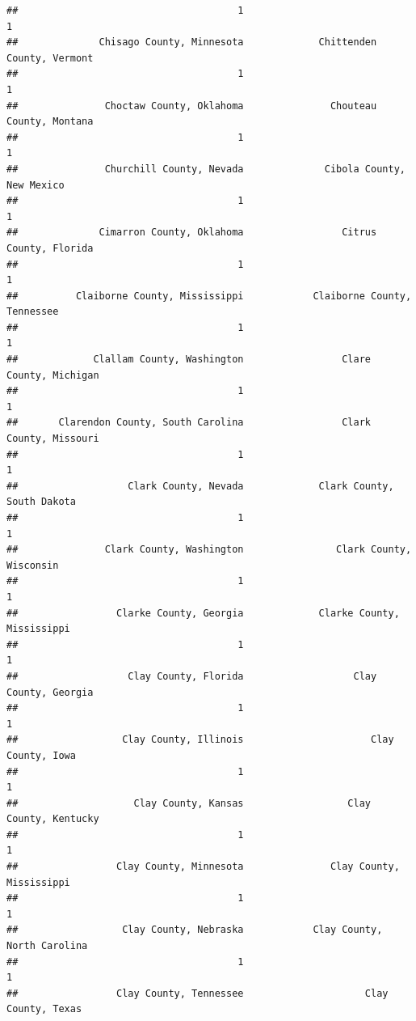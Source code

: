 \documentclass[
]{article}
\begin{document}
\begin{verbatim}
##                                      1                                      1 
##              Chisago County, Minnesota             Chittenden County, Vermont 
##                                      1                                      1 
##               Choctaw County, Oklahoma               Chouteau County, Montana 
##                                      1                                      1 
##               Churchill County, Nevada              Cibola County, New Mexico 
##                                      1                                      1 
##              Cimarron County, Oklahoma                 Citrus County, Florida 
##                                      1                                      1 
##          Claiborne County, Mississippi            Claiborne County, Tennessee 
##                                      1                                      1 
##             Clallam County, Washington                 Clare County, Michigan 
##                                      1                                      1 
##       Clarendon County, South Carolina                 Clark County, Missouri 
##                                      1                                      1 
##                   Clark County, Nevada             Clark County, South Dakota 
##                                      1                                      1 
##               Clark County, Washington                Clark County, Wisconsin 
##                                      1                                      1 
##                 Clarke County, Georgia             Clarke County, Mississippi 
##                                      1                                      1 
##                   Clay County, Florida                   Clay County, Georgia 
##                                      1                                      1 
##                  Clay County, Illinois                      Clay County, Iowa 
##                                      1                                      1 
##                    Clay County, Kansas                  Clay County, Kentucky 
##                                      1                                      1 
##                 Clay County, Minnesota               Clay County, Mississippi 
##                                      1                                      1 
##                  Clay County, Nebraska            Clay County, North Carolina 
##                                      1                                      1 
##                 Clay County, Tennessee                     Clay County, Texas 

\end{verbatim}
\end{document}
